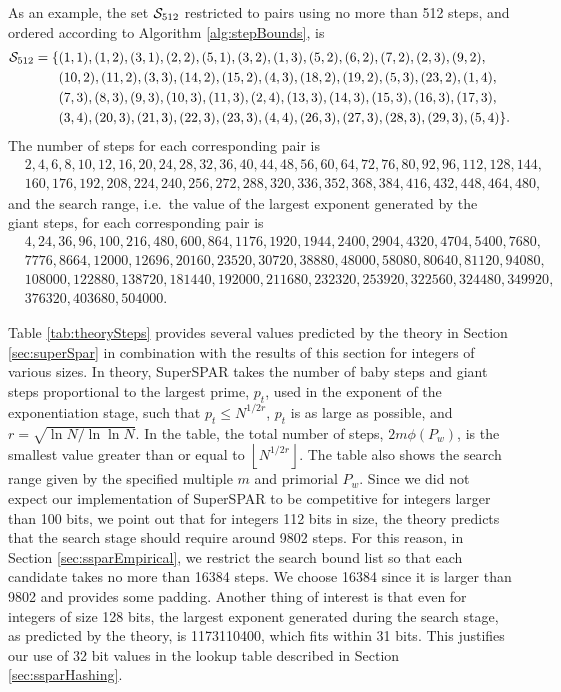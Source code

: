 \documentclass{ucalgthes1}
\theoremstyle{definition}
\newcommand{\floor}[1]{\left\lfloor #1 \right\rfloor}
\begin{document}
As an example, the set $\mathcal S_{512}$ restricted to pairs using no more than 512 steps, and ordered according to Algorithm \ref{alg:stepBounds}, is
\begin{align*}
\mathcal S_{512} = \{&(1,1),(1,2),(3,1),(2,2),(5,1),(3,2),(1,3),(5,2),(6,2),(7,2),(2,3),(9,2), \\
&(10,2),(11,2),(3,3),(14,2),(15,2),(4,3),(18,2),(19,2),(5,3),(23,2),(1,4), \\
&(7,3),(8,3),(9,3),(10,3),(11,3),(2,4),(13,3),(14,3),(15,3),(16,3),(17,3), \\
&(3,4),(20,3),(21,3),(22,3),(23,3),(4,4),(26,3),(27,3),(28,3),(29,3),(5,4)\}.
\end{align*}
The number of steps for each corresponding pair is
\begin{align*}
&2,4,6,8,10,12,16,20,24,28,32,36,40,44,48,56,60,64,72,76,80,92,96,112,128,144,\\
&160,176,192,208,224,240,256,272,288,320,336,352,368,384,416,432,448,464,480,
\end{align*}
and the search range, i.e.\ the value of the largest exponent generated by the giant steps, for each corresponding pair is
\begin{align*}
&4,24,36,96,100,216,480,600,864,1176,1920,1944,2400,2904,4320,4704,5400,7680,\\
&7776,8664,12000,12696,20160,23520,30720,38880,48000,58080,80640,81120,94080,\\
&108000,122880,138720,181440,192000,211680,232320,253920,322560,324480,349920,\\
&376320,403680,504000.
\end{align*}

Table \ref{tab:theorySteps} provides several values predicted by the theory in Section \ref{sec:superSpar} in combination with the results of this section for integers of various sizes.  In theory, SuperSPAR takes the number of baby steps and giant steps proportional to the largest prime, $p_t$, used in the exponent of the exponentiation stage, such that $p_t \le N^{1/2r}$, $p_t$ is as large as possible, and $r = \sqrt{\ln N / \ln \ln N}$.  In the table, the total number of steps, $2m\phi(P_w)$, is the smallest value greater than or equal to $\floor{N^{1/2r}}$.  The table also shows the search range given by the specified multiple $m$ and primorial $P_w$.  Since we did not expect our implementation of SuperSPAR to be competitive for integers larger than 100 bits, we point out that for integers 112 bits in size, the theory predicts that the search stage should require around 9802 steps.  For this reason, in Section \ref{sec:ssparEmpirical}, we restrict the search bound list so that each candidate takes no more than 16384 steps.  We choose 16384 since it is larger than 9802 and provides some padding.  Another thing of interest is that even for integers of size 128 bits, the largest exponent generated during the search stage, as predicted by the theory, is 1173110400, which fits within 31 bits.  This justifies our use of 32 bit values in the lookup table described in Section \ref{sec:ssparHashing}.
\end{document}
